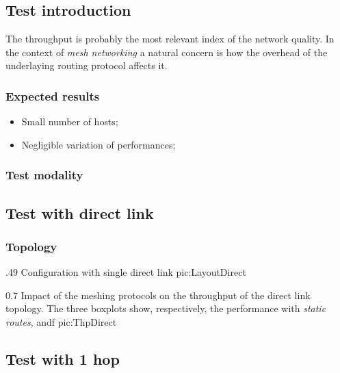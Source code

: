 \subsection{Test introduction}

    The throughput is probably the most relevant index of the network
    quality. In the context of \emph{mesh networking} a natural concern
    is how the overhead of the underlaying routing protocol affects it.

    \subsubsection{Expected results}

        \begin{itemize}
        \item   Small number of hosts;
        \item   Negligible variation of performances;
        \end{itemize}

    \subsubsection{Test modality}

\subsection{Test with direct link}

    \subsubsection{Topology}

                {.49\columnwidth}
                {Configuration with single direct link}
                {pic:LayoutDirect}

                {0.7 \columnwidth}
                {Impact of the meshing protocols on the throughput of the
                 direct link topology. The three boxplots show,
                 respectively, the performance with \emph{static routes},
                 \emph{\batman} andf \emph{\olsr}}
                {pic:ThpDirect}

\subsection{Test with 1 hop}

